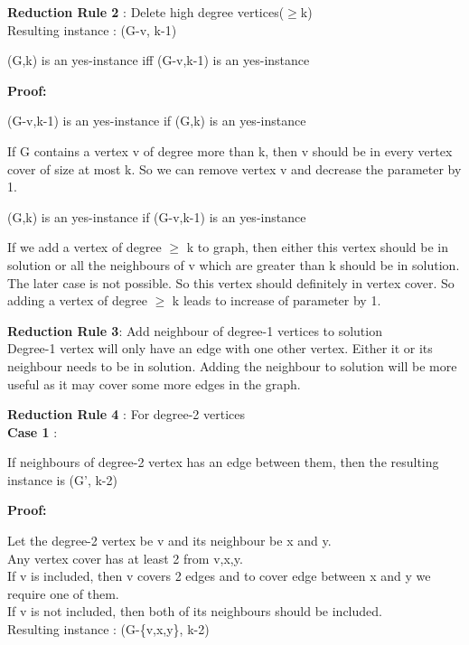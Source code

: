 \textbf{Reduction Rule 2} : Delete high degree vertices($\geq$k) \\
Resulting instance : (G-v, k-1) 

\begin{theorem}
       (G,k) is an yes-instance iff (G-v,k-1) is an yes-instance        
\end{theorem}

\textbf{Proof:}

\hfill \vspace{-1.5cm}
       \begin{center}
(G-v,k-1) is an yes-instance if (G,k) is an yes-instance               
       \end{center}
If G contains a vertex v of degree more than k, then v should be in
every vertex cover of size at most k. So we can remove vertex v and decrease the parameter by 1.

       \begin{center}
              (G,k) is an yes-instance if (G-v,k-1) is an yes-instance               
       \end{center} 
If we add a vertex of degree $\geq$ k to graph, then either this vertex should be in solution 
or all the neighbours of v which are greater than k should be in solution. The later case is not
possible. So this vertex should definitely in vertex cover. So adding a vertex of degree $\geq$ k leads
to increase of parameter by 1. 

\textbf{Reduction Rule 3}: Add neighbour of degree-1 vertices to solution \\
Degree-1 vertex will only have an edge with one other vertex. Either it or its neighbour needs to be in
solution. Adding the neighbour to solution will be more useful as it may cover some more edges in the
graph.

\textbf{Reduction Rule 4} : For degree-2 vertices \\
\textbf{Case 1} : 
\begin{theorem}
       If neighbours of degree-2 vertex has an edge between them, then the resulting instance 
       is (G', k-2) 
\end{theorem}
\textbf{Proof:}

       Let the degree-2 vertex be v and its neighbour be x and y. \\
       Any vertex cover has at least 2 from {v,x,y}. \\
       If v is included, then v covers 2 edges and to cover edge between x and y we require one of them. \\
       If v is not included, then both of its neighbours should be included. \\
       Resulting instance : (G-\{v,x,y\}, k-2)   


